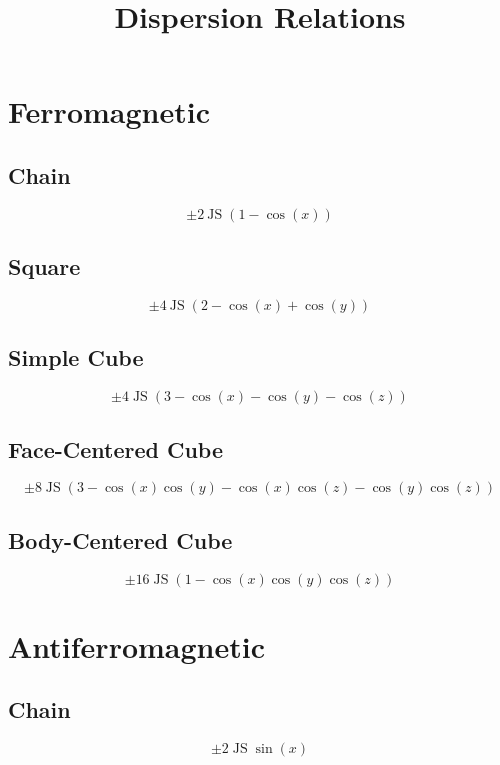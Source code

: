 \documentclass[aps,prl,preprint,groupedaddress]{revtex4}
\begin{document}
\title{Dispersion Relations}

\section{Ferromagnetic}
\subsection{Chain}
\begin{equation}
\pm 2 \: \mathrm{J S} \; (1 - \cos(x))
\label{eq:fmc}
\end{equation}

\subsection{Square}
\begin{equation}
\pm 4 \: \mathrm{J S} \; (2 - \cos(x) + \cos(y))
\label{eq:fmsq}
\end{equation}

\subsection{Simple Cube}
\begin{equation}
\pm 4 \; \mathrm{J S} \; (3 - \cos(x) - \cos(y) - \cos(z))
\label{eq:fmsc}
\end{equation}

\subsection{Face-Centered Cube}
\begin{equation}
\pm 8 \; \mathrm{J S} \; (3 - \cos(x) \cos(y) - \cos(x) \cos(z) - \cos(y) \cos(z))
\label{eq:fmfcc}
\end{equation}

\subsection{Body-Centered Cube}
\begin{equation}
\pm 16 \; \mathrm{J S} \; (1 - \cos(x) \cos(y) \cos(z))
\label{eq:fmbcc}
\end{equation}

\section{Antiferromagnetic}
\subsection{Chain}
\begin{equation}
\pm 2 \; \mathrm{J S} \; \sin(x)
\label{eq:afmc}
\end{equation}
\end{document}
